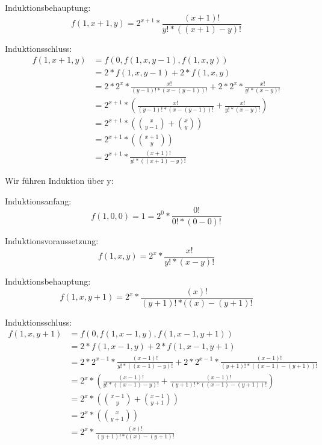 \documentclass[10pt,leqno ]{article}
\begin{document}
Induktionsbehauptung:
\begin{equation*}
f(1,x+1,y) = 2^{x+1} * \frac{(x+1)!}{y! * ((x+1) - y)!}
\end{equation*}

Induktionsschluss:
\begin{align*}
f(1,x+1,y) &= f(0, f(1,x,y-1), f(1,x,y)) \\
           &= 2 * f(1,x,y-1) + 2 * f(1,x,y) \\
           &= 2 * 2^x * \frac{x!}{(y-1)! * (x - (y-1))!} + 2 * 2^x * \frac{x!}{y! * (x - y)!} \\ %
           &= 2^{x+1} * (\frac{x!}{(y-1)! * (x - (y-1))!} + \frac{x!}{y! * (x - y)!}) \\
           &= 2^{x+1} * ( \binom{x}{y-1} + \binom{x}{y}) \\
           &= 2^{x+1} * ( \binom{x+1}{y}) \\
           &= 2^{x+1} * \frac{(x+1)!}{y! * ((x+1) - y)!}
\end{align*}

Wir führen Induktion über y:

Induktionsanfang:
\begin{equation*}
f(1,0,0) = 1 = 2^0 * \frac{0!}{0! * (0-0)!}
\end{equation*}

Induktionsvoraussetzung:
\begin{equation*}
f(1,x,y) = 2^x * \frac{x!}{y! * (x - y)!}
\end{equation*}

Induktionsbehauptung:
\begin{equation*}
f(1,x,y+1) = 2^{x} * \frac{(x)!}{(y+1)! * ((x) - (y+1)!}
\end{equation*}

Induktionsschluss:
\begin{align*}
f(1,x,y+1) &= f(0, f(1,x-1,y), f(1,x-1,y+1)) \\
           &= 2 * f(1,x-1,y) + 2 * f(1,x-1,y+1) \\
           &= 2 * 2^{x-1} * \frac{(x-1)!}{y! * ((x-1) - y)!} + 2 * 2^{x-1} * \frac{(x-1)!}{(y+1)! * ((x-1) - (y+1))!} \\ %
           &= 2^x * (\frac{(x-1)!}{y! * ((x-1) - y)!} + \frac{(x-1)!}{(y+1)! * ((x-1) - (y+1))!}) \\
           &= 2^x * ( \binom{x-1}{y} + \binom{x-1}{y+1}) \\
           &= 2^x * ( \binom{x}{y+1}) \\
           &= 2^x * \frac{(x)!}{(y+1)! * ((x) - (y+1)!}
\end{align*}
\end{document}
